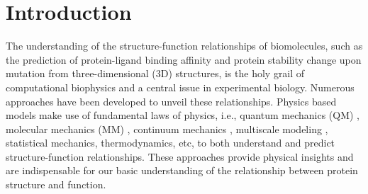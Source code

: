 \documentclass[10pt]{article}
\begin{document}
\section{Introduction}
The understanding  of the structure-function relationships of biomolecules, such as the prediction of protein-ligand binding affinity and protein stability change upon mutation from three-dimensional (3D)  structures,   is the holy grail of computational biophysics and a  central issue in experimental biology.  Numerous approaches have been developed to unveil these relationships. 
Physics based models make use of fundamental laws of physics, i.e., quantum mechanics (QM)  \cite{Warshel:1976, Cui:2002, YZhang:2009a}, molecular mechanics (MM)  \cite{McCammon:1977,CHARMM22, AMBER15}, continuum mechanics \cite{Roux:1999,Warshel:1998,Sharp:1990a,Tully-Smith:1970}, %
multiscale modeling  \cite{Holst:1993,Baker:2004,Dong:2008MCB}, 
statistical mechanics, thermodynamics,  etc, to both understand and predict  structure-function relationships. These approaches provide physical insights and are  indispensable for our basic understanding of the relationship between protein structure and function. 
\end{document}
